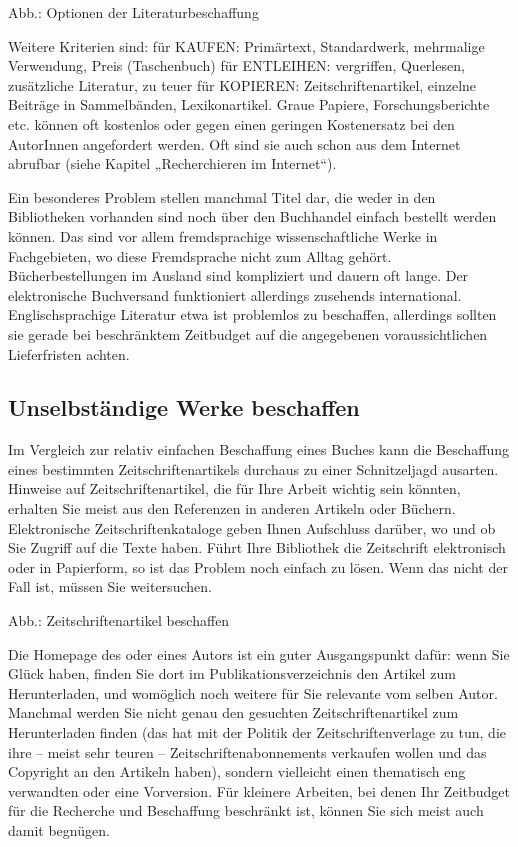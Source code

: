 \documentclass[]{book}
\theoremstyle{definition}
\theoremstyle{definition}
\theoremstyle{definition}
\theoremstyle{remark}
\begin{document}
Abb.: Optionen der Literaturbeschaffung

Weitere Kriterien sind: für KAUFEN: Primärtext, Standardwerk, mehrmalige
Verwendung, Preis (Taschenbuch) für ENTLEIHEN: vergriffen, Querlesen,
zusätzliche Literatur, zu teuer für KOPIEREN: Zeitschriftenartikel,
einzelne Beiträge in Sammelbänden, Lexikonartikel. Graue Papiere,
Forschungsberichte etc. können oft kostenlos oder gegen einen geringen
Kostenersatz bei den AutorInnen angefordert werden. Oft sind sie auch
schon aus dem Internet abrufbar (siehe Kapitel „Recherchieren im
Internet``).

Ein besonderes Problem stellen manchmal Titel dar, die weder in den
Bibliotheken vorhanden sind noch über den Buchhandel einfach bestellt
werden können. Das sind vor allem fremdsprachige wissenschaftliche Werke
in Fachgebieten, wo diese Fremdsprache nicht zum Alltag gehört.
Bücherbestellungen im Ausland sind kompliziert und dauern oft lange. Der
elektronische Buchversand funktioniert allerdings zusehends
international. Englischsprachige Literatur etwa ist problemlos zu
beschaffen, allerdings sollten sie gerade bei beschränktem Zeitbudget
auf die angegebenen voraussichtlichen Lieferfristen achten.

\subsection{Unselbständige Werke
beschaffen}\label{unselbstandige-werke-beschaffen}

Im Vergleich zur relativ einfachen Beschaffung eines Buches kann die
Beschaffung eines bestimmten Zeitschriftenartikels durchaus zu einer
Schnitzeljagd ausarten. Hinweise auf Zeitschriftenartikel, die für Ihre
Arbeit wichtig sein könnten, erhalten Sie meist aus den Referenzen in
anderen Artikeln oder Büchern. Elektronische Zeitschriftenkataloge geben
Ihnen Aufschluss darüber, wo und ob Sie Zugriff auf die Texte haben.
Führt Ihre Bibliothek die Zeitschrift elektronisch oder in Papierform,
so ist das Problem noch einfach zu lösen. Wenn das nicht der Fall ist,
müssen Sie weitersuchen.

Abb.: Zeitschriftenartikel beschaffen

Die Homepage des oder eines Autors ist ein guter Ausgangspunkt dafür:
wenn Sie Glück haben, finden Sie dort im Publikationsverzeichnis den
Artikel zum Herunterladen, und womöglich noch weitere für Sie relevante
vom selben Autor. Manchmal werden Sie nicht genau den gesuchten
Zeitschriftenartikel zum Herunterladen finden (das hat mit der Politik
der Zeitschriftenverlage zu tun, die ihre -- meist sehr teuren --
Zeitschriftenabonnements verkaufen wollen und das Copyright an den
Artikeln haben), sondern vielleicht einen thematisch eng verwandten oder
eine Vorversion. Für kleinere Arbeiten, bei denen Ihr Zeitbudget für die
Recherche und Beschaffung beschränkt ist, können Sie sich meist auch
damit begnügen.
\end{document}
